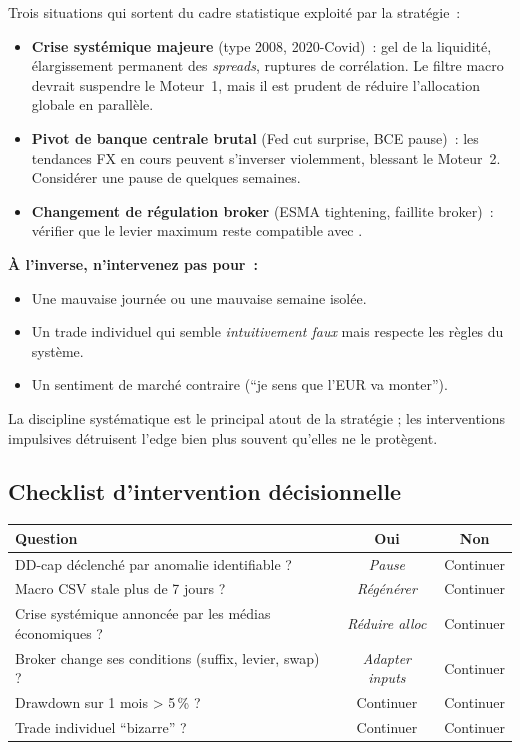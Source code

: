 \documentclass[11pt, a4paper]{scrartcl}
\begin{document}
Trois situations qui sortent du cadre statistique exploité par la stratégie~:
\begin{itemize}
\item \textbf{Crise systémique majeure} (type 2008, 2020-Covid)~: gel de la liquidité, élargissement permanent des \emph{spreads}, ruptures de corrélation. Le filtre macro devrait suspendre le Moteur~1, mais il est prudent de réduire l'allocation globale en parallèle.
\item \textbf{Pivot de banque centrale brutal} (Fed cut surprise, BCE pause)~: les tendances FX en cours peuvent s'inverser violemment, blessant le Moteur~2. Considérer une pause de quelques semaines.
\item \textbf{Changement de régulation broker} (ESMA tightening, faillite broker)~: vérifier que le levier maximum reste compatible avec .
\end{itemize}

\begin{warningbox}
\textbf{À l'inverse, n'intervenez pas pour~:}
\begin{itemize}
\item Une mauvaise journée ou une mauvaise semaine isolée.
\item Un trade individuel qui semble \emph{intuitivement faux} mais respecte les règles du système.
\item Un sentiment de marché contraire (\enquote{je sens que l'EUR va monter}).
\end{itemize}
La discipline systématique est le principal atout de la stratégie ; les
interventions impulsives détruisent l'edge bien plus souvent qu'elles ne le
protègent.
\end{warningbox}

\subsection{Checklist d'intervention décisionnelle}

\begin{center}
\renewcommand{\arraystretch}{1.3}
\small
\begin{tabular}{p{9cm}cc}
\toprule
\textbf{Question} & \textbf{Oui} & \textbf{Non} \\
\midrule
DD-cap déclenché par anomalie identifiable ?           & \emph{Pause} & Continuer \\
Macro CSV stale plus de 7 jours ?                       & \emph{Régénérer} & Continuer \\
Crise systémique annoncée par les médias économiques ?  & \emph{Réduire alloc} & Continuer \\
Broker change ses conditions (suffix, levier, swap) ?   & \emph{Adapter inputs} & Continuer \\
Drawdown sur 1 mois > 5\,\% ?                           & Continuer & Continuer \\
Trade individuel \enquote{bizarre} ?                    & Continuer & Continuer \\
\bottomrule
\end{tabular}
\end{center}
\end{document}
